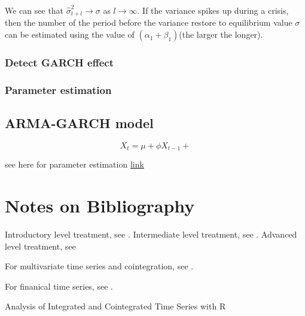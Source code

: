 \begin{remark}
	We can see that $\hat{\sigma}_{t+l}^2 \to \sigma$ as $l\to \infty$. If the variance spikes up during a crisis, then the number of the period before the variance restore to equilibrium value $\sigma$ can be estimated using the value of $(\alpha_1+\beta_1)$(the larger the longer).
\end{remark}



\subsubsection{Detect GARCH effect}


\subsubsection{Parameter estimation}


\subsection{ARMA-GARCH model}

\begin{definition}
	
	$$X_t = \mu + \phi X_{t-1} + $$
\end{definition}



see here for parameter estimation \href{https://en.wikipedia.org/wiki/Autoregressive_conditional_heteroskedasticity}{link}

\section{Notes on Bibliography}


Introductory level treatment, see \cite{chatfield2003analysis}.
Intermediate level treatment, see \cite{brockwell2002introduction}\cite{hamilton1994time}\cite{shumway2010time}\cite{enders2014applied}\cite{subbaRao2017timeSeries}.
Advanced level treatment, see \cite{brockwell1991time}


For multivariate time series and cointegration, see \cite{tsay2013multivariate}\cite{pfaff2008analysis}\cite{lutkepohl2005new}.

For finanical time series, see \cite{tsay2005analysis}\cite{tsay2013multivariate}\cite{hayashi2000econometrics}.


Analysis of Integrated and Cointegrated Time Series with R




